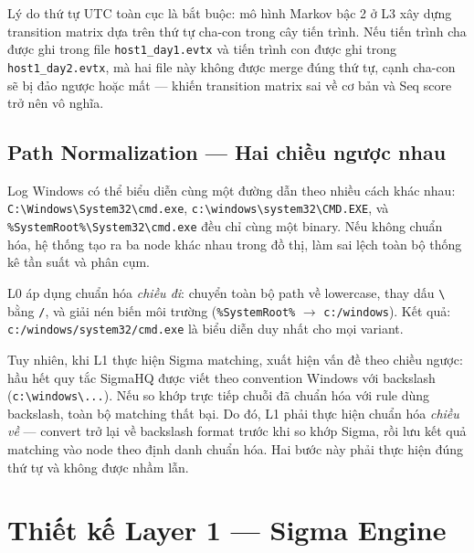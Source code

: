 \documentclass[../main.tex]{subfiles}
\begin{document}
Lý do thứ tự UTC toàn cục là bắt buộc: mô hình Markov bậc 2 ở L3 xây dựng transition matrix dựa trên thứ tự cha-con trong cây tiến trình. Nếu tiến trình cha được ghi trong file \texttt{host1\_day1.evtx} và tiến trình con được ghi trong \texttt{host1\_day2.evtx}, mà hai file này không được merge đúng thứ tự, cạnh cha-con sẽ bị đảo ngược hoặc mất — khiến transition matrix sai về cơ bản và Seq score trở nên vô nghĩa.

\subsection{Path Normalization — Hai chiều ngược nhau}
\label{subsection:3.3.2}

Log Windows có thể biểu diễn cùng một đường dẫn theo nhiều cách khác nhau: \texttt{C:\textbackslash Windows\textbackslash System32\textbackslash cmd.exe}, \texttt{c:\textbackslash windows\textbackslash system32\textbackslash CMD.EXE}, và \texttt{\%SystemRoot\%\textbackslash System32\textbackslash cmd.exe} đều chỉ cùng một binary. Nếu không chuẩn hóa, hệ thống tạo ra ba node khác nhau trong đồ thị, làm sai lệch toàn bộ thống kê tần suất và phân cụm.

L0 áp dụng chuẩn hóa \textit{chiều đi}: chuyển toàn bộ path về lowercase, thay dấu \texttt{\textbackslash} bằng \texttt{/}, và giải nén biến môi trường (\texttt{\%SystemRoot\%} $\to$ \texttt{c:/windows}). Kết quả: \texttt{c:/windows/system32/cmd.exe} là biểu diễn duy nhất cho mọi variant.

Tuy nhiên, khi L1 thực hiện Sigma matching, xuất hiện vấn đề theo chiều ngược: hầu hết quy tắc SigmaHQ được viết theo convention Windows với backslash (\texttt{c:\textbackslash windows\textbackslash...}). Nếu so khớp trực tiếp chuỗi đã chuẩn hóa với rule dùng backslash, toàn bộ matching thất bại. Do đó, L1 phải thực hiện chuẩn hóa \textit{chiều về} — convert trở lại về backslash format trước khi so khớp Sigma, rồi lưu kết quả matching vào node theo định danh chuẩn hóa. Hai bước này phải thực hiện đúng thứ tự và không được nhầm lẫn.

\section{Thiết kế Layer 1 — Sigma Engine}
\label{section:3.4}

\end{document}

